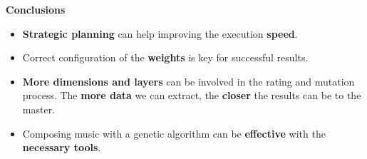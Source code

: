 \documentclass[a0,portrait]{a0poster}
\begin{document}
\begin{multicols}{2}
\begin{flushleft}
	\LARGE{\textbf{Conclusions}}
\end{flushleft}
\begin{itemize}
	\item \Large \textbf{Strategic planning }can help improving the execution \textbf{speed}.
	\item Correct configuration of the \textbf{weights} is key for successful results.
	\item \textbf{More dimensions and layers} can be involved in the rating and mutation process. The\textbf{ more data }we can extract, the \textbf{closer} the results can be to the master. 
	\item Composing music with a genetic algorithm can be \textbf{effective} with the \textbf{necessary tools}.
\end{itemize}

\color{DarkSlateGray} %







\end{multicols}
\end{document}
